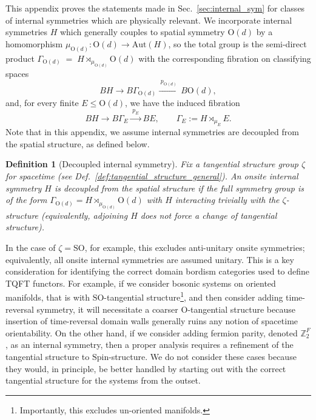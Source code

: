\documentclass[aps,prx,reprint,superscriptaddress,twocolumn,amsmath,amssymb,amsfonts, nofootinbib]{revtex4-2}
\newcommand{\SO}{\text{SO}}
\newcommand{\Z}{\mathbb{Z}}
\theoremstyle{apsstyle}
\newtheorem{definition}[theorem]{Definition}
\begin{document}
This appendix proves the statements made in Sec.~\ref{sec:internal_sym} for classes of internal symmetries which are physically relevant. We incorporate internal symmetries $H$ which generally couples to spatial symmetry $\mathrm{O}(d)$ by a homomorphism $\mu_{\mathrm{O}(d)}:\mathrm{O}(d)\to\mathrm{Aut}(H)$, so the total group is the semi-direct product $\Gamma_{\mathrm{O}(d)} \;=\; H\rtimes_{\mu_{\mathrm{O}(d)}} \mathrm{O}(d)$ with the corresponding fibration on classifying spaces
\begin{equation*}
BH \longrightarrow B\Gamma_{\mathrm{O}(d)} \xrightarrow{\;p_{\mathrm{O}(d)}\;} B\mathrm{O}(d),
\end{equation*}
and, for every finite $E\le \mathrm{O}(d)$, we have the induced fibration
\begin{equation*}BH \longrightarrow B\Gamma_{E} \xrightarrow{\;p_{E}\;} BE,\qquad \Gamma_E:=H\rtimes_{\mu_{E}}E.
\end{equation*}
Note that in this appendix, we assume internal symmetries are decoupled from the spatial structure, as defined below.

\bigskip 

\begin{definition}[Decoupled internal symmetry]\label{def:decoupled_internal}
Fix a tangential structure group $\zeta$ for spacetime (see Def.~\ref{def:tangential_structure_general}). An onsite internal symmetry $H$ is decoupled from the spatial structure if the full symmetry group is of the form $\Gamma_{\mathrm{O}(d)} = H\rtimes_{\mu_{\mathrm{O}(d)}} \mathrm{O}(d)$ with $H$ interacting trivially with the $\zeta$-structure (equivalently, adjoining $H$ does not force a change of tangential structure).
\end{definition}

\medskip

\noindent In the case of $\zeta=\SO$, for example, this excludes anti-unitary onsite symmetries; equivalently, all onsite internal symmetries are assumed unitary. This is a key consideration for identifying the correct domain bordism categories used to define TQFT functors. For example, if we consider bosonic systems on oriented manifolds, that is with $\SO$-tangential structure\footnote{Importantly, this excludes un-oriented manifolds.}, and then consider adding time-reversal symmetry, it will necessitate a coarser $\text{O}$-tangential structure because insertion of time-reversal domain walls generally ruins any notion of spacetime orientability. On the other hand, if we consider adding fermion parity, denoted $\Z_{2}^{F}$, as an internal symmetry, then a proper analysis requires a refinement of the tangential structure to $\mathrm{Spin}$-structure. We do not consider these cases because they would, in principle, be better handled by starting out with the correct tangential structure for the systems from the outset. 
\end{document}
